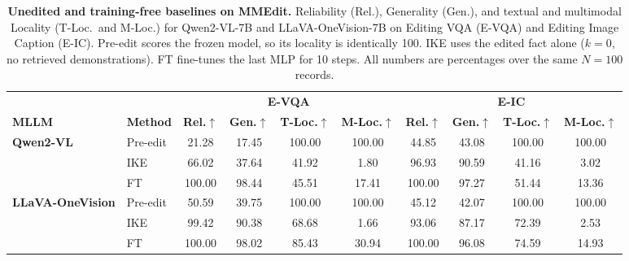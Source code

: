 \begin{table}[t]
\centering
\caption{\textbf{Unedited and training-free baselines on MMEdit.} Reliability (Rel.), Generality (Gen.), and textual and multimodal Locality (T-Loc.\ and M-Loc.) for Qwen2-VL-7B and LLaVA-OneVision-7B on Editing VQA (E-VQA) and Editing Image Caption (E-IC). Pre-edit scores the frozen model, so its locality is identically 100. IKE uses the edited fact alone ($k{=}0$, no retrieved demonstrations). FT fine-tunes the last MLP for 10 steps. All numbers are percentages over the same $N{=}100$ records.}
\label{tab:baselines_qwen_llava}
\small
\setlength{\tabcolsep}{3pt}
\begin{tabular}{ll|cccc|cccc}
\toprule
& & \multicolumn{4}{c|}{\textbf{E-VQA}} & \multicolumn{4}{c}{\textbf{E-IC}} \\
\cmidrule(lr){3-6} \cmidrule(lr){7-10}
\textbf{MLLM} & \textbf{Method}
& \textbf{Rel.}$\uparrow$ & \textbf{Gen.}$\uparrow$ & \textbf{T-Loc.}$\uparrow$ & \textbf{M-Loc.}$\uparrow$
& \textbf{Rel.}$\uparrow$ & \textbf{Gen.}$\uparrow$ & \textbf{T-Loc.}$\uparrow$ & \textbf{M-Loc.}$\uparrow$ \\
\midrule
\multirow{3}{1.7cm}{\centering\textbf{Qwen2-VL}}
& Pre-edit & 21.28 & 17.45 & 100.00 & 100.00 & 44.85 & 43.08 & 100.00 & 100.00 \\
& IKE       & 66.02 & 37.64 & 41.92  & 1.80   & 96.93 & 90.59 & 41.16  & 3.02   \\
& FT        & 100.00 & 98.44 & 45.51 & 17.41  & 100.00 & 97.27 & 51.44 & 13.36  \\
\midrule
\multirow{3}{1.7cm}{\centering\textbf{LLaVA-OneVision}}
& Pre-edit & 50.59 & 39.75 & 100.00 & 100.00 & 45.12 & 42.07 & 100.00 & 100.00 \\
& IKE       & 99.42 & 90.38 & 68.68  & 1.66   & 93.06 & 87.17 & 72.39  & 2.53   \\
& FT        & 100.00 & 98.02 & 85.43 & 30.94  & 100.00 & 96.08 & 74.59 & 14.93  \\
\bottomrule
\end{tabular}
\end{table}
